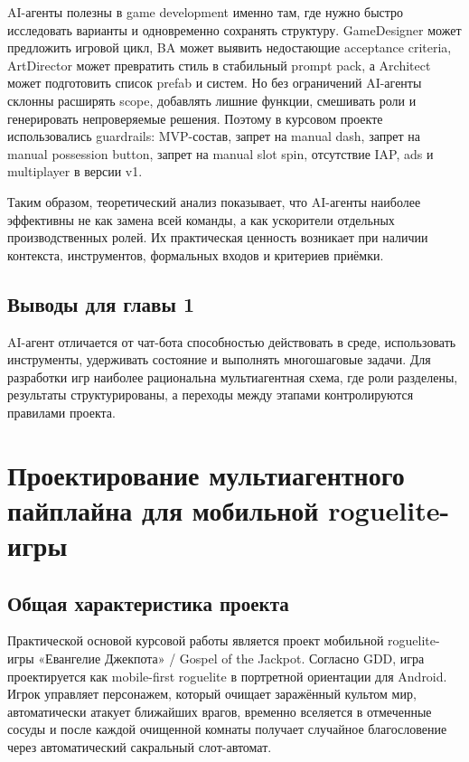 \documentclass[a4paper,12pt]{report}
\begin{document}
AI-агенты полезны в game development именно там, где нужно быстро исследовать варианты и одновременно сохранять структуру. GameDesigner может предложить игровой цикл, BA может выявить недостающие acceptance criteria, ArtDirector может превратить стиль в стабильный prompt pack, а Architect может подготовить список prefab и систем. Но без ограничений AI-агенты склонны расширять scope, добавлять лишние функции, смешивать роли и генерировать непроверяемые решения. Поэтому в курсовом проекте использовались guardrails: MVP-состав, запрет на manual dash, запрет на manual possession button, запрет на manual slot spin, отсутствие IAP, ads и multiplayer в версии v1.

Таким образом, теоретический анализ показывает, что AI-агенты наиболее эффективны не как замена всей команды, а как ускорители отдельных производственных ролей. Их практическая ценность возникает при наличии контекста, инструментов, формальных входов и критериев приёмки.

\section{Выводы для главы 1}

AI-агент отличается от чат-бота способностью действовать в среде, использовать инструменты, удерживать состояние и выполнять многошаговые задачи. Для разработки игр наиболее рациональна мультиагентная схема, где роли разделены, результаты структурированы, а переходы между этапами контролируются правилами проекта.

\chapter{Проектирование мультиагентного пайплайна для мобильной roguelite-игры}

\section{Общая характеристика проекта}

Практической основой курсовой работы является проект мобильной roguelite-игры «Евангелие Джекпота» / Gospel of the Jackpot. Согласно GDD, игра проектируется как mobile-first roguelite в портретной ориентации для Android. Игрок управляет персонажем, который очищает заражённый культом мир, автоматически атакует ближайших врагов, временно вселяется в отмеченные сосуды и после каждой очищенной комнаты получает случайное благословение через автоматический сакральный слот-автомат.
\end{document}
